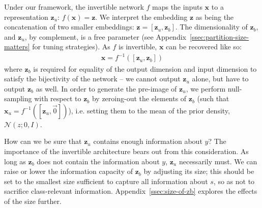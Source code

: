 Under our framework, the invertible network $f$ maps the inputs $\bm{x}$ to a representation $\bm{z}_u$:
$f(\bm{x}) = \bm{z}$.
We interpret the embedding $\bm{z}$ as being the concatenation of two smaller embeddings: $\bm{z} = [\bm{z}_u, \bm{z}_b]$.
The dimensionality of $\bm{z}_b$, and $\bm{z}_u$, by complement, is a free parameter (see Appendix~\ref{ssec:partition-size-matters} for tuning strategies).
As $f$ is invertible, $\bm{x}$ can be recovered like so:
\begin{align}
  \bm{x} = f^{-1}([\bm{z}_u, \bm{z}_b])
  \label{eq:zreconstruct}
\end{align}
where $\bm{z}_b$ is required for equality of the output dimension and input dimension to satisfy the bijectivity of the network -- we cannot output $\bm{z}_u$ alone, but have to output $\bm{z}_b$ as well. In order to generate the pre-image of $\bm{z}_u$, we perform null-sampling with respect to $\bm{z}_b$ by zeroing-out the elements of $\bm{z}_b$ (such that $\bm{x}_{u} = f^{-1}([\bm{z}_{u}, \stackrel{\rightarrow}{0}])$), i.e. setting them to the mean of the prior density, $\mathcal{N}(z;0, I)$.

How can we be sure that $\bm{z}_u$ contains enough information about $y$?
The importance of the invertible architecture bears out from this consideration. %
As long as $\bm{z}_b$ does not contain the information about $y$, $\bm{z}_u$ necessarily must.
We can raise or lower the information capacity of $\bm{z}_b$ by adjusting its size;
this should be set to the smallest size sufficient to capture all information about $s$, so as not to sacrifice class-relevant information.
Appendix~\ref{ssec:size-of-zb} explores the effects of the size further.




